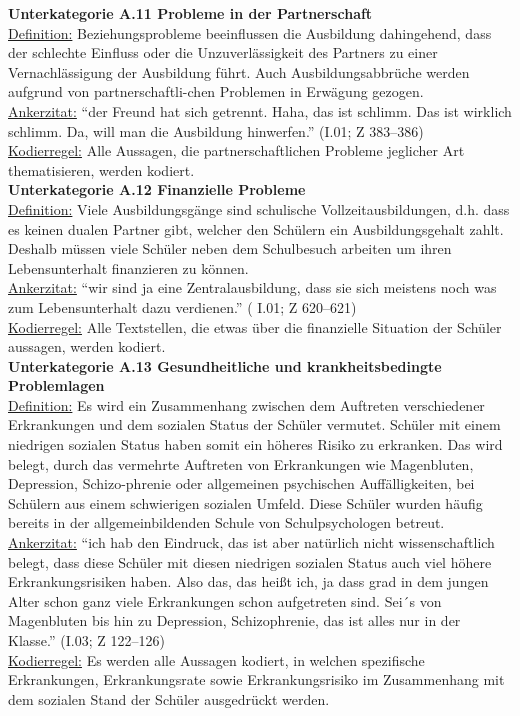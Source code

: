 \textbf{Unterkategorie A.11 Probleme in der Partnerschaft}\\
\underline{Definition:} Beziehungsprobleme beeinflussen die Ausbildung dahingehend, dass der schlechte Einfluss oder die Unzuverlässigkeit des Partners zu einer Vernachlässigung der Ausbildung führt. Auch Ausbildungsabbrüche werden aufgrund von partnerschaftli-chen Problemen in Erwägung gezogen.\\
\underline{Ankerzitat:} "`der Freund hat sich getrennt. Haha, das ist schlimm. Das ist wirklich schlimm. Da, will man die Ausbildung hinwerfen."' (I.01; Z 383--386)\\
\underline{Kodierregel:} Alle Aussagen, die partnerschaftlichen Probleme jeglicher Art thematisieren, werden kodiert.\\

\textbf{Unterkategorie A.12 Finanzielle Probleme}\\
\underline{Definition:} Viele Ausbildungsgänge sind schulische Vollzeitausbildungen, d.h. dass es keinen dualen Partner gibt, welcher den Schülern ein Ausbildungsgehalt zahlt. Deshalb müssen viele Schüler neben dem Schulbesuch arbeiten um ihren Lebensunterhalt finanzieren zu können.\\
\underline{Ankerzitat:} "`wir sind ja eine Zentralausbildung, dass sie sich meistens noch was zum Lebensunterhalt dazu verdienen."' ( I.01; Z 620--621)\\
\underline{Kodierregel:} Alle Textstellen, die etwas über die finanzielle Situation der Schüler aussagen, werden kodiert.\\

\textbf{Unterkategorie A.13 Gesundheitliche und krankheitsbedingte Problemlagen}\\
\underline{Definition:} Es wird ein Zusammenhang zwischen dem Auftreten verschiedener Erkrankungen und dem sozialen Status der Schüler vermutet. Schüler mit einem niedrigen sozialen Status haben somit ein höheres Risiko zu erkranken. Das wird belegt, durch das vermehrte Auftreten von Erkrankungen wie Magenbluten, Depression, Schizo-phrenie oder allgemeinen psychischen Auffälligkeiten, bei Schülern aus einem schwierigen sozialen Umfeld. Diese Schüler wurden häufig bereits in der allgemeinbildenden Schule von Schulpsychologen betreut.\\
\underline{Ankerzitat:} "`ich hab den Eindruck, das ist aber natürlich nicht wissenschaftlich belegt, dass diese Schüler mit diesen niedrigen sozialen Status auch viel höhere Erkrankungsrisiken haben. Also das, das heißt ich, ja dass grad in dem jungen Alter schon ganz viele Erkrankungen schon aufgetreten sind. Sei´s von Magenbluten bis hin zu Depression, Schizophrenie, das ist alles nur in der Klasse."' (I.03; Z 122--126)\\
\underline{Kodierregel:} Es werden alle Aussagen kodiert, in welchen spezifische Erkrankungen, Erkrankungsrate sowie Erkrankungsrisiko im Zusammenhang mit dem sozialen Stand der Schüler ausgedrückt werden.\\

